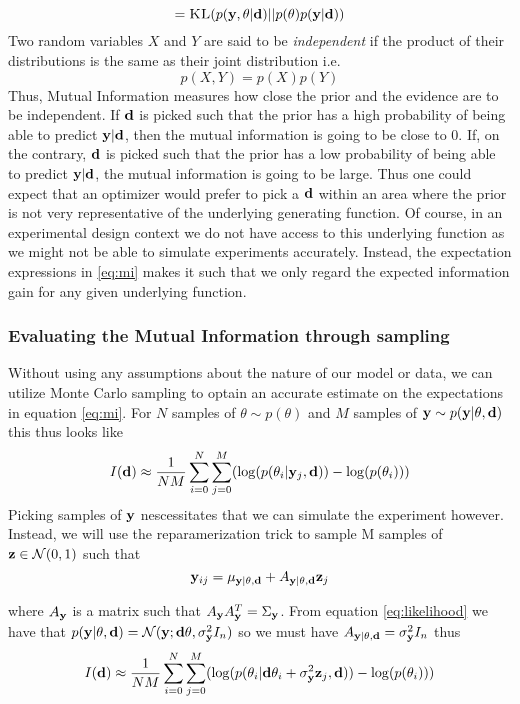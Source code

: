$$ = \textsc{KL}(p(\mathbf{y}, \theta | \mathbf{d})|| p(\theta)p(\mathbf{y}|\mathbf{d}))$$
Two random variables $X$ and $Y$ are said to be \textit{independent} if the product of their distributions is the same as their joint distribution i.e.
\begin{equation}p(X,Y) = p(X)p(Y)\end{equation}
Thus, Mutual Information measures how close the prior and the evidence are to be independent. 
If $\mathbf{d}$ is picked such that the prior has a high probability of being able to predict $\mathbf{y}|\mathbf{d}$, then the mutual information is going to be close to 0. 
If, on the contrary, $\mathbf{d}$ is picked such that the prior has a low probability of being able to predict $\mathbf{y}|\mathbf{d}$, the mutual information is going to be large.
Thus one could expect that an optimizer would prefer to pick a $\mathbf{d}$ within an area where the prior is not very representative of the underlying generating function.
Of course, in an experimental design context we do not have access to this underlying function as we might not be able to simulate experiments accurately. Instead, the expectation expressions in \ref{eq:mi}
makes it such that we only regard the expected information gain for any given underlying function.

\subsubsection{Evaluating the Mutual Information through sampling}
Without using any assumptions about the nature of our model or data, we can utilize Monte Carlo sampling to optain an accurate estimate on the expectations in equation \ref{eq:mi}.
For $N$ samples of $\theta \sim p(\theta)$ and $M$ samples of $\mathbf{y} \sim p(\mathbf{y} | \theta, \mathbf{d})$ this thus looks like
\begin{equation}
  I(\mathbf{d}) \approx \frac{1}{NM}\sum_{i=0}^N\sum_{j=0}^M(\log (p(\theta_i | \mathbf{y}_j, \mathbf{d})) - \log(p(\theta_i)))
\end{equation}
Picking samples of $\mathbf{y}$ nescessitates that we can simulate the experiment however.
Instead, we will use the reparamerization trick to sample M samples of $\mathbf{z}\in \mathcal{N}(0, 1)$ such that
\begin{equation}
  \mathbf{y}_{ij} = \mu_{\mathbf{y}| \theta, \mathbf{d}} + A_{\mathbf{y}| \theta, \mathbf{d}}\mathbf{z}_j
\end{equation}

where $A_{\mathbf{y}}$ is a matrix such that $A_{\mathbf{y}}A_{\mathbf{y}}^T = \Sigma_{\mathbf{y}}$. 
From equation \ref{eq:likelihood} we have that $p(\mathbf{y}| \theta, \mathbf{d}) = \mathcal{N}(\mathbf{y}; \mathbf{d}\theta, \sigma^2_{\mathbf{y}}I_n)$ so we must have $A_{\mathbf{y}|\theta, \mathbf{d}} = \sigma^2_{\mathbf{y}}I_n$
thus 
\begin{equation}
  I(\mathbf{d}) \approx \frac{1}{NM}\sum_{i=0}^N\sum_{j=0}^M(\log (p(\theta_i | \mathbf{d} \theta_i + \sigma^2_{\mathbf{y}}\mathbf{z}_j, \mathbf{d})) - \log(p(\theta_i)))
\end{equation}

